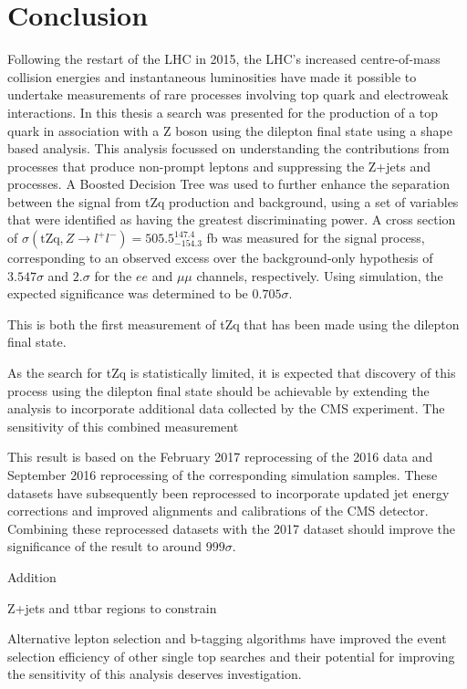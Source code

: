 \chapter{Conclusion}\label{chapter:conclusion}
Following the restart of the LHC in 2015, the LHC's increased centre-of-mass collision energies and instantaneous luminosities have made it possible to undertake measurements of rare processes involving top quark and electroweak interactions.
In this thesis a search was presented for the production of a top quark in association with a Z boson using the dilepton final state using a shape based analysis.
This analysis focussed on understanding the contributions from processes that produce non-prompt leptons and suppressing the Z+jets and \ttbar processes.
A Boosted Decision Tree was used to further enhance the separation between the signal from tZq production and background, using a set of variables that were identified as having the greatest discriminating power.
A cross section of $\sigma (\textrm{tZq}, Z \rightarrow l^{+} l^{-}) = 505.5^{147.4}_{-154.3}$ fb was measured for the signal process, corresponding to an observed excess over the background-only hypothesis of $3.547\sigma$ and $2.\sigma$ for the $ee$ and $\mu\mu$ channels, respectively.
Using simulation, the expected significance was determined to be $0.705 \sigma$.

This is both the first measurement of tZq that has been made using the dilepton final state.

As the search for tZq is statistically limited, it is expected that discovery of this process using the dilepton final state should be achievable by extending the analysis to incorporate additional data collected by the CMS experiment.
The sensitivity of this combined measurement 

This result is based on the February 2017 reprocessing of the 2016 data and September 2016 reprocessing of the corresponding simulation samples.
These datasets have subsequently been reprocessed to incorporate updated jet energy corrections and improved alignments and calibrations of the CMS detector.
Combining these reprocessed datasets with the 2017 dataset should improve the significance of the result to around $999\sigma$.

Addition

Z+jets and ttbar regions to constrain 

Alternative lepton selection and b-tagging algorithms have improved the event selection efficiency of other single top searches and their potential for improving the sensitivity of this analysis deserves investigation.

